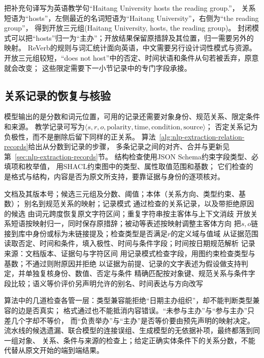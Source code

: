 把补充句译写为英语教学句“Haitang University hosts the reading group.”，
关系短语为“hosts”，左侧最近的名词短语为“Haitang University”，右侧为“the reading group”，
得到开放三元组(Haitang University, hosts, the reading group)。
封闭模式可以把“hosts”归一为“主办”；开放结果保留原措辞及其位置，归一需要另外的映射。
ReVerb的规则与词汇统计面向英语，中文需要另行设计词性模式与资源。
开放三元组较短，“does not host”中的否定、时间状语和条件从句若被丢弃，原意就会改变；
这些限定需要下一小节记录中的专门字段承接。

\subsection{关系记录的恢复与核验}
\label{sec:nlp-extraction-relation-records}

模型输出的是分数和词元位置，可用的记录还需要对象身份、规范关系、限定条件和来源。
教学记录可写为$\langle s,r,o,\text{polarity},\text{time},\text{condition},\text{source}\rangle$；
否定关系记为负极性，而不是删除后留下同样的正关系。
算法~\ref{alg:nlp-extraction-relation-records}给出从分数到记录的步骤，
多条记录之间的对齐、合并与更新见第~\ref{sec:nlp-extraction-records}节。
结构检查使用JSON Schema约束字段类型、必填项和枚举值\cite{wright2022jsonschema}，
用SHACL约束图中的类型、属性取值范围和基数\cite{knublauch2017shacl}；
它们检查的是格式与结构，内容是否为原文所支持，要靠证据与身份的逐项核对。

\begin{algorithm}[关系记录的恢复与核验]
  \label{alg:nlp-extraction-relation-records}
  \begin{algorithmic}[1]
    \Require 文档及其版本号；候选三元组及分数、阈值；本体（关系方向、类型约束、基数）；
      别名到规范关系的映射；记录模式
    \Ensure 通过检查的关系记录，以及带拒绝原因的候选
      \State 由词元跨度恢复原文字符区间；重复字符串按主客体与上下文消歧
      \State 开放关系短语按映射归一，同时保存原措辞；被动等表述按映射调整主客体方向
      \State 把$s,o$链接到库中身份或标为未链接提及；检查类型是否满足$r$的定义域与值域
      \State 从证据范围读取否定、时间和条件，填入极性、时间与条件字段；时间按日期规范解析
      \State 记录来源：文档版本、证据句与字符区间
      \State 用记录模式检查字段，用图约束检查类型与基数；不通过则附原因并拒绝
      \State 以证据为前提、记录的文字表述为假设做支持判定，并单独复核身份、数值、否定与条件
    \EndFor
    \State 精确匹配按对象键、规范关系与条件字段比较；语义等价评价另声明允许的别名、时间表达与方向改写
  \end{algorithmic}
\end{algorithm}

算法中的几道检查各管一层：类型兼容能拒绝“日期主办组织”，却不能判断类型兼容的边是否真实；
格式通过也不能抵消内容错误。“未参与主办”与“参与主办”只差几个字却不等价，
而“负责举办”与“主办”是否等价要由预先声明的映射决定。
流水线的候选遗漏、联合模型的连接误组、生成模型的无依据补项，最终都落到同一组对象、
关系、条件与来源的检查上；给定正确实体条件下的关系分数，不能代替从原文开始的端到端结果。

